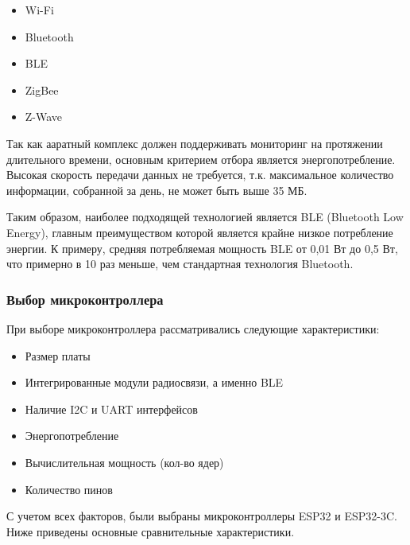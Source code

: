 \documentclass[12pt, russian]{extarticle}
\begin{document}
\begin{spacing}{1.5}
\begin{itemize}
    \item Wi-Fi 
    \item Bluetooth
    \item BLE
    \item ZigBee
    \item Z-Wave
\end{itemize}

Так как ааратный комплекс должен поддерживать мониторинг на протяжении длительного времени, основным критерием отбора является энергопотребление. Высокая скорость передачи данных не требуется, т.к. максимальное количество информации, собранной за день, не может быть выше 35 МБ. 

Таким образом, наиболее подходящей технологией является BLE (Bluetooth Low Energy), главным преимуществом которой является крайне низкое потребление энергии. К примеру, средняя потребляемая мощность BLE от 0,01 Вт до 0,5 Вт, что примерно в 10 раз меньше, чем стандартная технология Bluetooth. 

\subsubsection{Выбор микроконтроллера}

При выборе микроконтроллера рассматривались следующие характеристики:

\begin{itemize}
    \item Размер платы
    \item Интегрированные модули радиосвязи, а именно BLE
    \item Наличие I2C и UART интерфейсов
    \item Энергопотребление
    \item Вычислительная мощность (кол-во ядер)
    \item Количество пинов
\end{itemize}

С учетом всех факторов, были выбраны микроконтроллеры ESP32 и ESP32-3C.
Ниже приведены основные сравнительные характеристики. 


\end{spacing}
\end{document}
